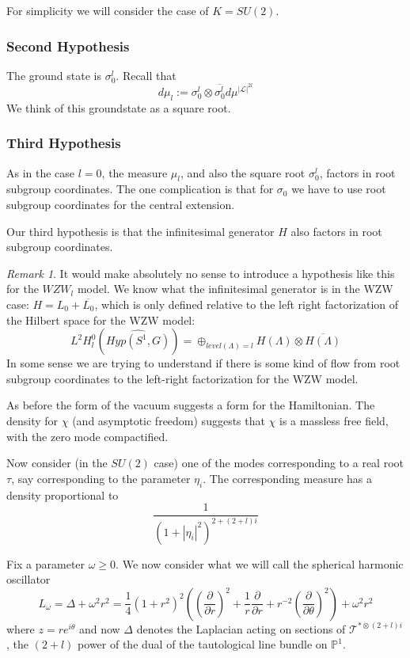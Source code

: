 \documentclass{amsart}
\theoremstyle{conjecture}
\theoremstyle{definition}
\theoremstyle{question}
\theoremstyle{questions}
\theoremstyle{remark}
\newtheorem*{remark}{Remark}
\theoremstyle{remarks}
\theoremstyle{example}
\numberwithin{equation}{section}
\begin{document}
For simplicity we will consider the case of $K=SU(2)$.


\subsubsection{Second Hypothesis} The ground state is $\sigma_0^l$. Recall that
$$d\mu_l:= \sigma_0^l \otimes \overline{\sigma_0^l} d\mu^{|\mathcal L|^{2l}} $$
We think of this groundstate as a square root.

\subsubsection{Third Hypothesis}

As in the case $l=0$, the measure $\mu_l$, and also the square root $\sigma_0^l$, factors in root subgroup coordinates. The one complication is that for $\sigma_0$ we have to use root subgroup coordinates for the central extension.

Our third hypothesis is that the infinitesimal generator $H$ also factors in root subgroup coordinates.

 \begin{remark} It would make absolutely no sense to introduce a hypothesis like this for the $WZW_l$ model.
We know what the infinitesimal generator is in the WZW case: $H=L_0+\overline {L_0}$, which is only defined
 relative to the left right factorization of the Hilbert space for the WZW model:
$$ L^2H^0_l(\widehat{Hyp(S^1,G)}) =\oplus_{level(\Lambda)=l}H(\Lambda)\otimes \overline{H(\Lambda)}$$
In some sense we are trying to understand if there is some kind of flow from root subgroup coordinates
to the left-right factorization for the WZW model. 
\end{remark}

As before the form of the vacuum suggests a form for the Hamiltonian. The density for $\chi$ (and asymptotic freedom) suggests that $\chi$ is a massless free field, with the zero mode compactified.

Now consider (in the $SU(2)$ case) one of the modes corresponding to a real root $\tau$, say corresponding to the parameter $\eta_i$. The corresponding measure has a density proportional to
$$\frac{1}{(1+|\eta_i|^2)^{2+(2+l)i}}$$

Fix a parameter $\omega\ge 0$. We now consider what we will call
the spherical harmonic oscillator
$$L_{\omega}=\Delta+\omega^2 r^2=\frac 14(1+r^2)^2((\frac{\partial}{\partial r})^2+\frac 1 r\frac{\partial}{\partial r}+r^{-2}(\frac{\partial}{\partial \theta})^2)+\omega^2r^2$$
where $z=re^{i\theta}$ and now
$\Delta$ denotes the Laplacian acting on sections of $\mathcal T^{*\otimes (2+l)i}$, the $(2+l)$ power of the dual of the tautological line bundle on $\mathbb P^1$.
\end{document}
